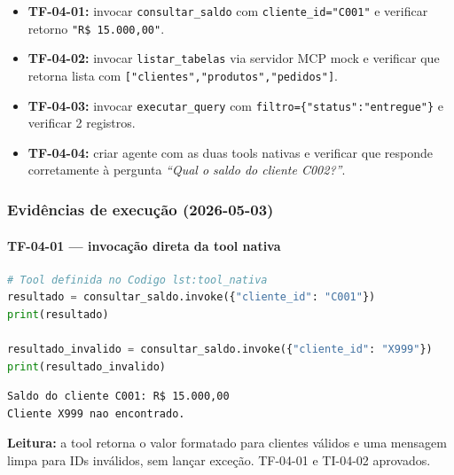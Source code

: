 \begin{itemize}[leftmargin=*]
  \item \textbf{TF-04-01:} invocar \texttt{consultar\_saldo} com
        \texttt{cliente\_id="C001"} e verificar retorno
        \texttt{"R\$ 15.000,00"}.
  \item \textbf{TF-04-02:} invocar \texttt{listar\_tabelas} via
        servidor MCP mock e verificar que retorna lista com
        \texttt{["clientes","produtos","pedidos"]}.
  \item \textbf{TF-04-03:} invocar \texttt{executar\_query} com
        \texttt{filtro=\{"status":"entregue"\}} e verificar 2 registros.
  \item \textbf{TF-04-04:} criar agente com as duas tools nativas e
        verificar que responde corretamente \`a pergunta
        \textit{``Qual o saldo do cliente C002?''}.
\end{itemize}

\subsubsection*{Evid\^encias de execu\c{c}\~ao (2026-05-03)}

\paragraph{TF-04-01 --- invoca\c{c}\~ao direta da tool nativa}

\begin{lstlisting}[language=Python,
      caption={TF-04-01 --- invoca\c{c}\~ao direta de \texttt{consultar\_saldo}.},
      label={lst:cap4_tf0401_codigo}]
# Tool definida no Codigo lst:tool_nativa
resultado = consultar_saldo.invoke({"cliente_id": "C001"})
print(resultado)

resultado_invalido = consultar_saldo.invoke({"cliente_id": "X999"})
print(resultado_invalido)
\end{lstlisting}

\begin{lstlisting}[language=bash,
      caption={TF-04-01 --- sa\'ida: saldo existente e cliente inexistente.},
      label={lst:cap4_tf0401_saida}]
Saldo do cliente C001: R$ 15.000,00
Cliente X999 nao encontrado.
\end{lstlisting}

\noindent\textbf{Leitura:} a tool retorna o valor formatado para
clientes v\'alidos e uma mensagem limpa para IDs inv\'alidos, sem
lan\c{c}ar exce\c{c}\~ao. TF-04-01 e TI-04-02 aprovados.

